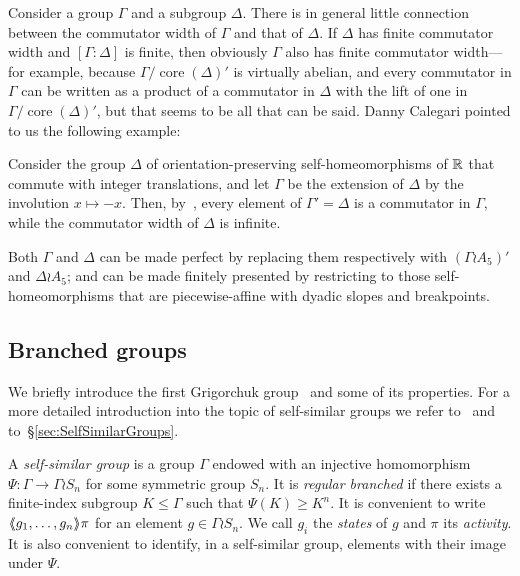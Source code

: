 \documentclass[a4paper,11pt]{amsart}
\begin{document}
Consider a group $\Gamma$ and a subgroup $\Delta$. There is in general
little connection between the commutator width of $\Gamma$ and that of
$\Delta$. If $\Delta$ has finite commutator width and
$[\Gamma:\Delta]$ is finite, then obviously $\Gamma$ also has finite
commutator width---for example, because
$\Gamma/\operatorname{core}(\Delta)'$ is virtually abelian, and every
commutator in $\Gamma$ can be written as a product of a commutator in
$\Delta$ with the lift of one in
$\Gamma/\operatorname{core}(\Delta)'$, but that seems to be all that
can be said. Danny Calegari pointed to us the following example:
\begin{ex}\label{ex:commwidthsubgroup}
  Consider the group $\Delta$ of orientation-preserving
  self-homeomorphisms of $\mathbb{R}$ that commute with integer translations,
  and let $\Gamma$ be the extension of $\Delta$ by the involution
  $x\mapsto-x$. Then, by~\cite[Theorems~2.3
  and~2.4]{Eisenbud-Hirsch-Neumann:SeifertBundles}, every element of
  $\Gamma'=\Delta$ is a commutator in $\Gamma$, while the commutator
  width of $\Delta$ is infinite.

  Both $\Gamma$ and $\Delta$ can be made perfect by replacing them
  respectively with $(\Gamma\wr A_5)'$ and $\Delta\wr A_5$; and can be
  made finitely presented by restricting to those self-homeo\-mor\-phisms
  that are piecewise-affine with dyadic slopes and breakpoints.
\end{ex}

\subsection{Branched groups}\label{ss:bg}
We briefly introduce the first Grigorchuk
group~\cite{Grigorchuk:Burnside} and some of its properties. For a more
detailed introduction into the topic of self-similar groups we refer
to~\cite{Bartholdi-Grigorchuk-Sunik:BranchGroups,Nekrashevych:SelfSimilarGroups} and
to~\S\ref{sec:SelfSimilarGroups}.

A \emph{self-similar group} is a group $\Gamma$ endowed with an
injective homomorphism $\Psi\colon\Gamma\to\Gamma\wr S_n$ for some
symmetric group $S_n$. It is \emph{regular branched} if there exists a
finite-index subgroup $K\le\Gamma$ such that $\Psi(K)\ge K^n$. It is
convenient to write $\langle\negthickspace\langle g_1,\dots,g_n\rangle\negthickspace\rangle\pi$ for an element
$g\in\Gamma\wr S_n$. We call $g_i$ the \emph{states} of $g$ and $\pi$
its \emph{activity}. It is also convenient to identify, in a
self-similar group, elements with their image under $\Psi$.
\end{document}
